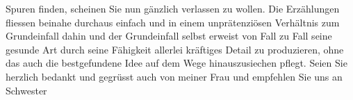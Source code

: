 \begin{ledgroupsized}[t]{13cm}
               Spuren finden, scheinen Sie nun gänzlich verlassen zu wollen. Die Erzählungen
               fliessen beinahe durchaus einfach und in einem unprätenziösen Verhältnis zum
               Grundeinfall dahin und der Grundeinfall selbst erweist von Fall zu Fall seine gesunde
               Art durch seine Fähigkeit allerlei kräftiges Detail zu produzieren, ohne das auch die
               bestgefundene Idee auf dem Wege hinauszusiechen pflegt.\pend
           \pstart
           Seien Sie herzlich bedankt und gegrüsst auch von meiner Frau und empfehlen Sie uns an Schwester\pend
           
         
         \endnumbering{}\end{ledgroupsized}  \newcommand{\dateiname}{L01940}\newcommand{\titel}{Arthur Schnitzler an Max Mell, 28. 6. 1910}\newcommand{\editorInnen}{Martin Anton Müller und Gerd-Hermann Susen}
      